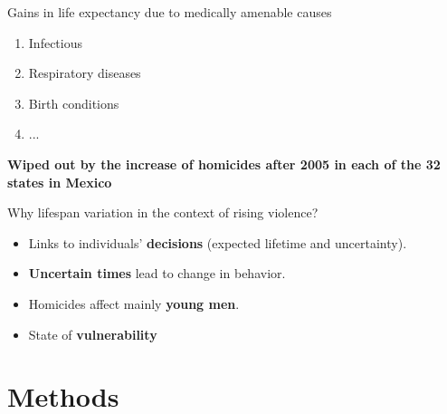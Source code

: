 \documentclass[xcolor={dvipsnames}]{beamer}
\begin{document}
\begin{frame}

\LARGE{

Gains in life expectancy due to medically amenable causes
\begin{enumerate}
\item Infectious
\item Respiratory diseases 
\item Birth conditions
\item ...
\end{enumerate}

 \pause
\begin{center}
\textbf{Wiped out by the increase of homicides after 2005 in each of the 32 states in Mexico}
\end{center}				

}
\end{frame}


\begin{frame}
\LARGE{
Why lifespan variation \pause in the context of rising violence?
\pause
		\begin{itemize}
		
		\item Links to individuals' \textbf{decisions} (expected lifetime and uncertainty). \pause

		\item \textbf{Uncertain times} lead to change in behavior. \pause
		
		\item Homicides affect mainly \textbf{young men}. \pause
		
		\item State of \textbf{vulnerability}
						
		\end{itemize}

}
\end{frame}

\section{Methods}
\end{document}
